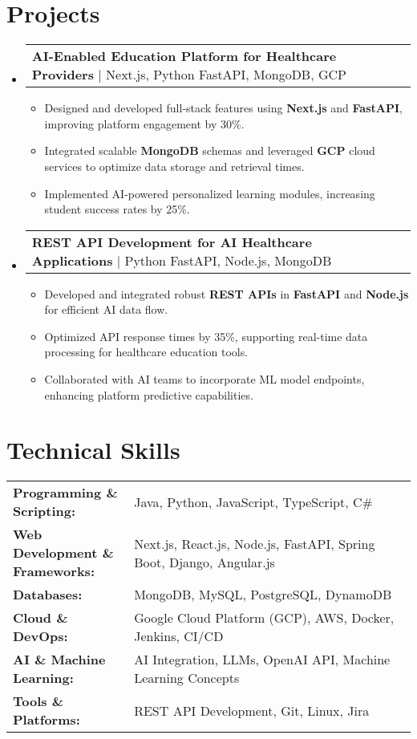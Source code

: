 \documentclass[letterpaper,11pt]{article}
\makeatletter
\newcommand{\resumeItem}[1]{
  \item\footnotesize{
    {#1 \vspace{-2pt}}
  }
}
\newcommand{\resumeProjectHeading}[2]{
    \item
    \begin{tabular*}{1.001\textwidth}{l@{\extracolsep{\fill}}r}
      \small#1 & \textbf{\small #2}\\
    \end{tabular*}\vspace{-7pt}
}
\newcommand{\resumeSubHeadingListStart}{\begin{itemize}[leftmargin=0pt, label={}]}
\newcommand{\resumeSubHeadingListEnd}{\end{itemize}}
\newcommand{\resumeItemListStart}{\begin{itemize}[leftmargin=*]}
\newcommand{\resumeItemListEnd}{\end{itemize}\vspace{-5pt}}
\makeatother
\begin{document}
\section{Projects}
    \vspace{-5pt}
    \resumeSubHeadingListStart
      \resumeProjectHeading
          {\textbf{AI-Enabled Education Platform for Healthcare Providers} | Next.js, Python FastAPI, MongoDB, GCP}{}
          \resumeItemListStart
              \resumeItem{Designed and developed full-stack features using \textbf{Next.js} and \textbf{FastAPI}, improving platform engagement by 30\%.}
              \resumeItem{Integrated scalable \textbf{MongoDB} schemas and leveraged \textbf{GCP} cloud services to optimize data storage and retrieval times.}
              \resumeItem{Implemented AI-powered personalized learning modules, increasing student success rates by 25\%.}
          \resumeItemListEnd
          \vspace{-16pt}
      \resumeProjectHeading
          {\textbf{REST API Development for AI Healthcare Applications} | Python FastAPI, Node.js, MongoDB}{}
          \resumeItemListStart
              \resumeItem{Developed and integrated robust \textbf{REST APIs} in \textbf{FastAPI} and \textbf{Node.js} for efficient AI data flow.}
              \resumeItem{Optimized API response times by 35\%, supporting real-time data processing for healthcare education tools.}
              \resumeItem{Collaborated with AI teams to incorporate ML model endpoints, enhancing platform predictive capabilities.}
          \resumeItemListEnd
    \resumeSubHeadingListEnd
\vspace{-10pt}
\section{Technical Skills}
        \vspace{-14pt}
        \begin{table}[h]
            \footnotesize
            \begin{tabular}{p{0.3\linewidth} p{0.7\linewidth}}
                \textbf{Programming \& Scripting:} & Java, Python, JavaScript, TypeScript, C\# \\
                \textbf{Web Development \& Frameworks:} & Next.js, React.js, Node.js, FastAPI, Spring Boot, Django, Angular.js \\
                \textbf{Databases:} & MongoDB, MySQL, PostgreSQL, DynamoDB \\
                \textbf{Cloud \& DevOps:} & Google Cloud Platform (GCP), AWS, Docker, Jenkins, CI/CD \\
                \textbf{AI \& Machine Learning:} & AI Integration, LLMs, OpenAI API, Machine Learning Concepts \\
                \textbf{Tools \& Platforms:} & REST API Development, Git, Linux, Jira \\
            \end{tabular}
        \end{table}
\end{document}
